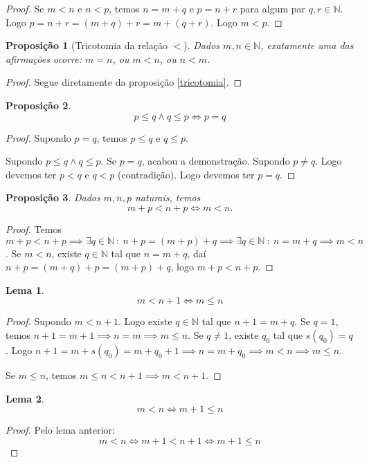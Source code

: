 \documentclass{article}
\newtheorem{prop}{Proposição}[section]
\theoremstyle{theorem}
\theoremstyle{lemma}
\newtheorem{lema}{Lema}
\theoremstyle{definition}
\theoremstyle{remark}
\begin{document}
\begin{proof}
	Se $m<n$ e $n<p$, temos $n = m+q$ e $p = n+r$ para algum par $q,r\in \mathbb{N}$. Logo $p = n +r = (m +q) +r =m +(q+r)$. Logo $m<p$.
\end{proof}
\begin{prop}[Tricotomia da relação $<$]
	Dados $m,n\in \mathbb{N}$, exatamente uma das afirmações ocorre: $m=n$, ou $m<n$, ou $n<m$.
\end{prop}
\begin{proof}
	Segue diretamente da proposição \ref{tricotomia}.
\end{proof}
\begin{prop}
	$$ p\leq q \land q \leq p \iff  p = q$$
\end{prop}
\begin{proof}
	Supondo $p = q$, temos $p\leq q $ e $q \leq p$. 

	Supondo $p\leq q \land q\leq p$. Se $p=q$, acabou a demonstração. Supondo $p\neq q$. Logo devemos ter $p <q $ e $q <p$ (contradição). Logo devemos ter $p=q$.

\end{proof}
\begin{prop}
	Dados $m,n,p$ naturais, temos $$m +p < n+p \iff m <n.$$
\end{prop}
\begin{proof}
	Temos $m+p < n+p \implies \exists q \in \mathbb{N} \: : \: n+p = (m+p) + q \implies  \exists q \in \mathbb{N} \: : \: n = m + q \implies m<n$.
	Se $m < n$, existe $q \in \mathbb{N}$ tal que $n = m+q$, daí $n+p = (m+q) + p = (m+p) + q$, logo $ m+ p < n+p$.
\end{proof}
\begin{lema}
	\label{lemaDesigualdade}
	$$ m < n+1 \iff m \leq n$$
\end{lema}
\begin{proof}
	Supondo $m<n+1$. Logo existe $q\in \mathbb{N}$ tal que $n+1 = m+q$. Se $q = 1$, temos $n+1  = m+1 \implies n = m \implies m \leq n$. Se $q\neq 1$, existe $q_0$ tal que $s(q_0) = q$. Logo $n+1 = m+s(q_0) = m+q_0+1\implies n = m+q_0 \implies m< n \implies m \leq n$. 

	Se $m \leq n$, temos $m\leq n < n+1 \implies m<n+1$.
\end{proof}
\begin{lema}
	$$ m < n \iff m +1\leq n$$
\end{lema}
\begin{proof}
	Pelo lema anterior:
	$$m < n \iff m+1  < n+1 \iff m+1 \leq n $$

\end{proof}
\end{document}

